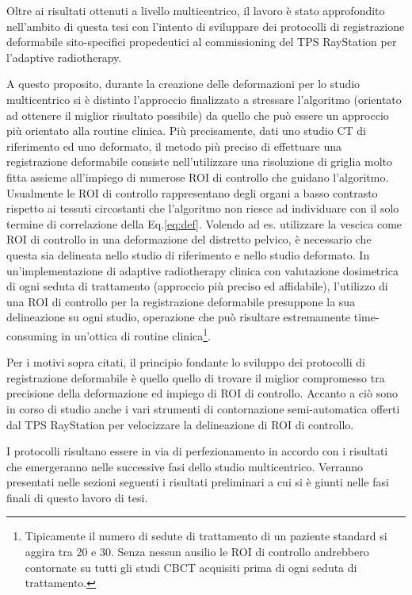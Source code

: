 Oltre ai risultati ottenuti a livello multicentrico, il lavoro è stato approfondito nell'ambito di questa tesi con l'intento di sviluppare dei protocolli di registrazione deformabile sito-specifici propedeutici al commissioning del TPS RayStation per l'adaptive radiotherapy. 

A questo proposito, durante la creazione delle deformazioni per lo studio multicentrico si è distinto l'approccio finalizzato a stressare l'algoritmo (orientato ad ottenere il miglior risultato possibile) da quello che può essere un approccio più orientato alla routine clinica. Più precisamente, dati uno studio CT di riferimento ed uno deformato, il metodo più preciso di effettuare una registrazione deformabile consiste nell'utilizzare una risoluzione di griglia molto fitta assieme all'impiego di numerose ROI di controllo che guidano l'algoritmo. Usualmente le ROI di controllo rappresentano degli organi a basso contrasto rispetto ai tessuti circostanti che l'algoritmo non riesce ad individuare con il solo termine di correlazione della Eq.\eqref{eq:def}. Volendo ad es. utilizzare la vescica come ROI di controllo in una deformazione del distretto pelvico, è necessario che questa sia delineata nello studio di riferimento e nello studio deformato. In un'implementazione di adaptive radiotherapy clinica con valutazione dosimetrica di ogni seduta di trattamento (approccio più preciso ed affidabile), l'utilizzo di una ROI di controllo per la registrazione deformabile presuppone la sua delineazione su ogni studio, operazione che può risultare estremamente time-consuming in un'ottica di routine clinica\footnote{Tipicamente il numero di sedute di trattamento di un paziente standard si aggira tra 20 e 30. Senza nessun ausilio le ROI di controllo andrebbero contornate su tutti gli studi CBCT acquisiti prima di ogni seduta di trattamento.}.

Per i motivi sopra citati, il principio fondante lo sviluppo dei protocolli di registrazione deformabile è quello quello di trovare il miglior compromesso tra precisione della deformazione ed impiego di ROI di controllo. Accanto a ciò sono in corso di studio anche i vari strumenti di contornazione semi-automatica offerti dal TPS RayStation per velocizzare la delineazione di ROI di controllo.

I protocolli risultano essere in via di perfezionamento in accordo con i risultati che emergeranno nelle successive fasi dello studio multicentrico. Verranno presentati nelle sezioni seguenti i risultati preliminari a cui si è giunti nelle fasi finali di questo lavoro di tesi. 

